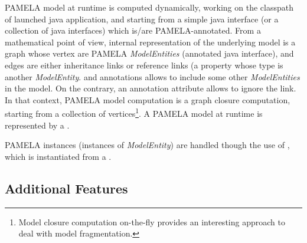 PAMELA model at runtime is computed dynamically, working on the classpath of launched java application, and starting from a simple java interface (or a collection of java interfaces) which is/are PAMELA-annotated. From a mathematical point of view, internal representation of the underlying model is a graph whose vertex are PAMELA \emph{ModelEntities} (annotated java interface), and edges are either inheritance links or reference links (a property whose type is another \emph{ModelEntity}.  and  annotations allows to include some other \emph{ModelEntities} in the model. On the contrary, an annotation attribute  allows to ignore the link. In that context, PAMELA model computation is a graph closure computation, starting from a collection of vertices\footnote{Model closure computation on-the-fly provides an interesting approach to deal with model fragmentation.}. A PAMELA model at runtime is represented by a .

PAMELA instances (instances of \emph{ModelEntity}) are handled though the use of , which is instantiated from a .


\subsection{Additional Features}

